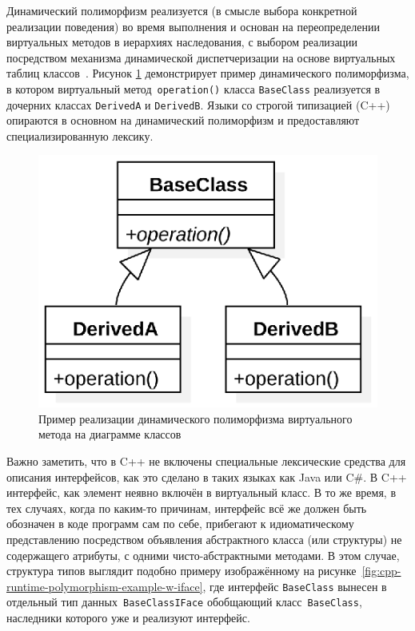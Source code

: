 Динамический полиморфизм
реализуется (в смысле выбора конкретной реализации поведения) во время
выполнения и основан на переопределении виртуальных
методов в иерархиях наследования, с выбором реализации
посредством механизма динамической
диспетчеризации на основе виртуальных таблиц
классов~\cite{Meyer1997, gof1994design-patterns}.
Рисунок \ref{fig:cpp-runtime-polymorphism-example} демонстрирует
пример динамического полиморфизма, в котором виртуальный
метод~\texttt{operation()} класса \texttt{BaseClass} реализуется
в дочерних классах \texttt{DerivedA} и \texttt{DerivedB}.
Языки со строгой типизацией (C++) опираются в основном на динамический
полиморфизм и предоставляют специализированную лексику.

\begin{figure}
    \centering
    \includegraphics[width=0.35\linewidth]{images/illustrative/runtime polymorphism.eps}
    \caption{Пример реализации динамического полиморфизма виртуального метода на диаграмме классов}
    \label{fig:cpp-runtime-polymorphism-example}
\end{figure}

Важно заметить, что в C++ не включены специальные лексические средства для
описания интерфейсов, как это сделано в таких языках как Java
или C\#. В C++ интерфейс, как элемент неявно включён в виртуальный
класс. В то же время, в тех случаях, когда по каким-то причинам,
интерфейс всё же должен быть обозначен в коде программ сам по себе,
прибегают к идиоматическому представлению посредством объявления абстрактного класса
(или структуры) не содержащего атрибуты, с одними чисто-абстрактными
методами. В этом случае, структура типов выглядит подобно примеру
изображённому на рисунке~\ref{fig:cpp-runtime-polymorphism-example-w-iface},
где интерфейс \texttt{BaseClass} вынесен в отдельный тип
данных~\texttt{BaseClassIFace} обобщающий класс~\texttt{BaseClass},
наследники которого уже и реализуют интерфейс.

